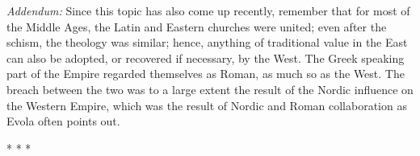 \hfill

\textit{Addendum:} Since this topic has also come up recently, remember that for most of the Middle Ages, the Latin and Eastern churches were united; even after the schism, the theology was similar; hence, anything of traditional value in the East can also be adopted, or recovered if necessary, by the West. The Greek speaking part of the Empire regarded themselves as Roman, as much so as the West. The breach between the two was to a large extent the result of the Nordic influence on the Western Empire, which was the result of Nordic and Roman collaboration as Evola often points out.


\begin{center}* * *\end{center}

